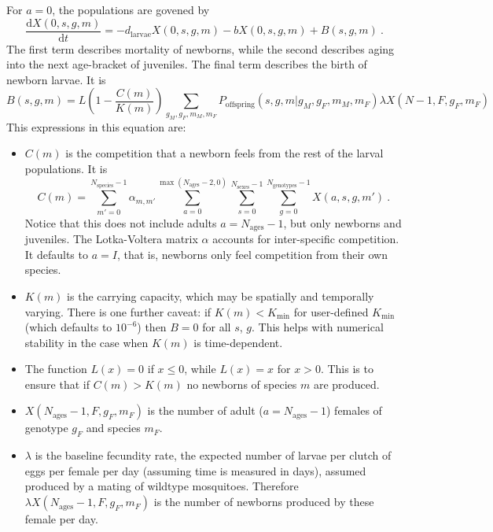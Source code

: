 \documentclass[11pt,a4paper]{article}
\begin{document}
For $a=0$, the populations are govened by
\begin{equation}
\frac{\mathrm{d}X(0, s, g, m)}{\mathrm{d} t} = -d_{\mathrm{larvae}}X(0, s, g, m) - b X(0, s, g, m) + B(s, g, m) \ .
\end{equation}
The first term describes mortality of newborns, while the second describes aging into the next age-bracket of juveniles.  The final term describes the birth of newborn larvae.  It is
\begin{equation}
B(s, g, m) = L\left(1 -  \frac{C(m)}{K(m)} \right) \sum_{g_{M}, g_{F}, m_{M}, m_{F}}P_{\mathrm{offspring}}(s, g, m | g_{M}, g_{F}, m_{M}, m_{F}) \lambda X(N-1, F, g_{F}, m_{F})
\end{equation}
This expressions in this equation are:
\begin{itemize}
\item $C(m)$ is the competition that a newborn feels from the rest of the larval populations.  It is
\begin{equation}
C(m) = \sum_{m'=0}^{N_{\mathrm{species}} - 1}\alpha_{m, m'} \sum_{a=0}^{\max(N_{\mathrm{ages}} - 2, 0)}\sum_{s=0}^{N_{\mathrm{sexes}} - 1} \sum_{g=0}^{N_{\mathrm{genotypes}} - 1}  X(a, s, g, m')\ .
\end{equation}
Notice that this does not include adults $a=N_{\mathrm{ages}} - 1$, but only newborns and juveniles.  The Lotka-Voltera matrix $\alpha$ accounts for inter-specific competition.  It defaults to $a=I$, that is, newborns only feel competition from their own species.
\item $K(m)$ is the carrying capacity, which may be spatially and temporally varying.  There is one further caveat: if $K(m)<K_{\mathrm{min}}$ for user-defined $K_{\mathrm{min}}$ (which defaults to $10^{-6}$) then $B=0$ for all $s$, $g$.  This helps with numerical stability in the case when $K(m)$ is time-dependent.
\item The function $L(x)=0$ if $x\leq 0$, while $L(x)=x$ for $x>0$.  This is to ensure that if $C(m)>K(m)$ no newborns of species $m$ are produced.
\item $X(N_{\mathrm{ages}}-1, F, g_{F}, m_{F})$ is the number of adult ($a=N_{\mathrm{ages}}-1$) females of genotype $g_{F}$ and species $m_{F}$.
\item $\lambda$ is the baseline fecundity rate, the expected number of larvae per clutch of eggs per female per day (assuming time is measured in days), assumed produced by a mating of wildtype mosquitoes.  Therefore $\lambda X(N_{\mathrm{ages}}-1, F, g_{F}, m_{F})$ is the number of newborns produced by these female per day.  

\end{itemize}
\end{document}
